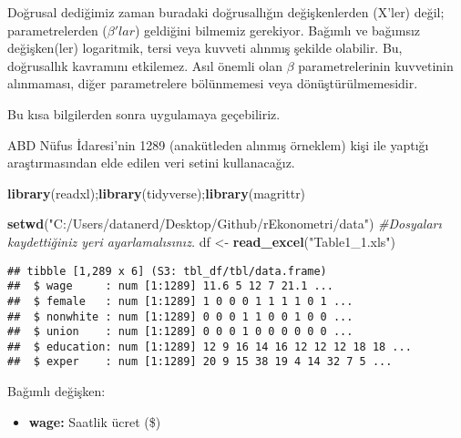 \documentclass[
]{book}
\newenvironment{Shaded}{\begin{snugshade}}{\end{snugshade}}
\newcommand{\CommentTok}[1]{\textcolor[rgb]{0.56,0.35,0.01}{\textit{#1}}}
\newcommand{\KeywordTok}[1]{\textcolor[rgb]{0.13,0.29,0.53}{\textbf{#1}}}
\newcommand{\NormalTok}[1]{#1}
\newcommand{\OperatorTok}[1]{\textcolor[rgb]{0.81,0.36,0.00}{\textbf{#1}}}
\newcommand{\StringTok}[1]{\textcolor[rgb]{0.31,0.60,0.02}{#1}}
\providecommand{\tightlist}{%
  \setlength{\itemsep}{0pt}\setlength{\parskip}{0pt}}
\begin{document}
Doğrusal dediğimiz zaman buradaki doğrusallığın değişkenlerden (X'ler) değil; parametrelerden (\(\beta'lar\)) geldiğini bilmemiz gerekiyor. Bağımlı ve bağımsız değişken(ler) logaritmik, tersi veya kuvveti alınmış şekilde olabilir. Bu, doğrusallık kavramını etkilemez. Asıl önemli olan \(\beta\) parametrelerinin kuvvetinin alınmaması, diğer parametrelere bölünmemesi veya dönüştürülmemesidir.

Bu kısa bilgilerden sonra uygulamaya geçebiliriz.

ABD Nüfus İdaresi'nin 1289 (anakütleden alınmış örneklem) kişi ile yaptığı araştırmasından elde edilen veri setini kullanacağız.

\begin{Shaded}
\begin{Highlighting}[]
\KeywordTok{library}\NormalTok{(readxl);}\KeywordTok{library}\NormalTok{(tidyverse);}\KeywordTok{library}\NormalTok{(magrittr)}

\KeywordTok{setwd}\NormalTok{(}\StringTok{"C:/Users/datanerd/Desktop/Github/rEkonometri/data"}\NormalTok{) }\CommentTok{#Dosyaları kaydettiğiniz yeri ayarlamalısınız.}
\NormalTok{df <-}\StringTok{ }\KeywordTok{read_excel}\NormalTok{(}\StringTok{"Table1_1.xls"}\NormalTok{)}
\end{Highlighting}
\end{Shaded}

\begin{Shaded}
\end{Shaded}

\begin{verbatim}
## tibble [1,289 x 6] (S3: tbl_df/tbl/data.frame)
##  $ wage     : num [1:1289] 11.6 5 12 7 21.1 ...
##  $ female   : num [1:1289] 1 0 0 0 1 1 1 1 0 1 ...
##  $ nonwhite : num [1:1289] 0 0 0 1 1 0 0 1 0 0 ...
##  $ union    : num [1:1289] 0 0 0 1 0 0 0 0 0 0 ...
##  $ education: num [1:1289] 12 9 16 14 16 12 12 12 18 18 ...
##  $ exper    : num [1:1289] 20 9 15 38 19 4 14 32 7 5 ...
\end{verbatim}

Bağımlı değişken:

\begin{itemize}
\tightlist
\item
  \textbf{wage:} Saatlik ücret (\$)
\end{itemize}
\end{document}
